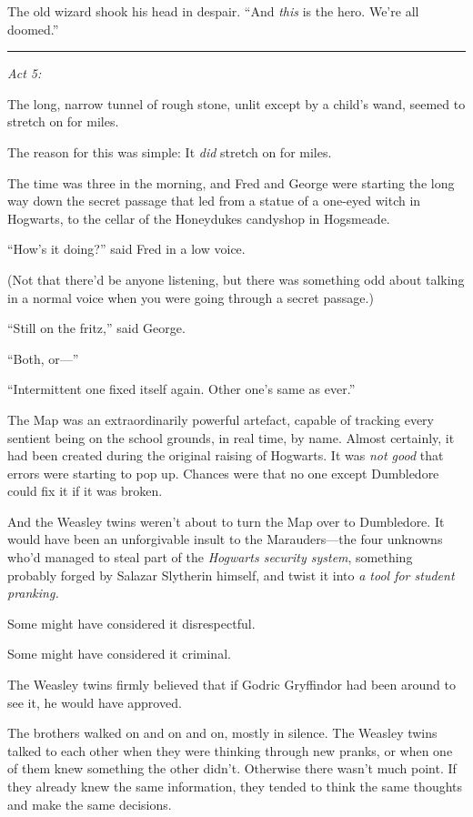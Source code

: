 The old wizard shook his head in despair. ``And \emph{this} is the hero.
We're all doomed.''

\begin{center}\rule{3in}{0.4pt}\end{center}

\emph{Act 5:}

The long, narrow tunnel of rough stone, unlit except by a child's wand,
seemed to stretch on for miles.

The reason for this was simple: It \emph{did} stretch on for miles.

The time was three in the morning, and Fred and George were starting the
long way down the secret passage that led from a statue of a one-eyed
witch in Hogwarts, to the cellar of the Honeydukes candyshop in
Hogsmeade.

``How's it doing?'' said Fred in a low voice.

(Not that there'd be anyone listening, but there was something odd about
talking in a normal voice when you were going through a secret passage.)

``Still on the fritz,'' said George.

``Both, or---''

``Intermittent one fixed itself again. Other one's same as ever.''

The Map was an extraordinarily powerful artefact, capable of tracking
every sentient being on the school grounds, in real time, by name.
Almost certainly, it had been created during the original raising of
Hogwarts. It was \emph{not good} that errors were starting to pop up.
Chances were that no one except Dumbledore could fix it if it was
broken.

And the Weasley twins weren't about to turn the Map over to Dumbledore.
It would have been an unforgivable insult to the Marauders---the four
unknowns who'd managed to steal part of the \emph{Hogwarts security
system}, something probably forged by Salazar Slytherin himself, and
twist it into \emph{a tool for student pranking.}

Some might have considered it disrespectful.

Some might have considered it criminal.

The Weasley twins firmly believed that if Godric Gryffindor had been
around to see it, he would have approved.

The brothers walked on and on and on, mostly in silence. The Weasley
twins talked to each other when they were thinking through new pranks,
or when one of them knew something the other didn't. Otherwise there
wasn't much point. If they already knew the same information, they
tended to think the same thoughts and make the same decisions.

